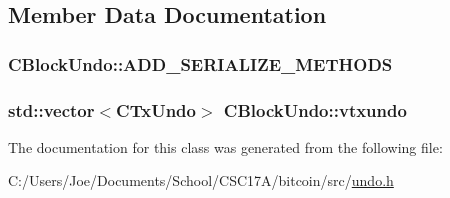 \subsection{Member Data Documentation}
\hypertarget{class_c_block_undo_a4fecc9723902f51e25b57e2e2d45334a}{}
\subsubsection[{A\+D\+D\+\_\+\+S\+E\+R\+I\+A\+L\+I\+Z\+E\+\_\+\+M\+E\+T\+H\+O\+D\+S}]{\setlength{\rightskip}{0pt plus 5cm}C\+Block\+Undo\+::\+A\+D\+D\+\_\+\+S\+E\+R\+I\+A\+L\+I\+Z\+E\+\_\+\+M\+E\+T\+H\+O\+D\+S}\label{class_c_block_undo_a4fecc9723902f51e25b57e2e2d45334a}
\hypertarget{class_c_block_undo_ad0baf7a4d3634b27b4affac2e7cf75c9}{}
\subsubsection[{vtxundo}]{\setlength{\rightskip}{0pt plus 5cm}std\+::vector$<${\bf C\+Tx\+Undo}$>$ C\+Block\+Undo\+::vtxundo}\label{class_c_block_undo_ad0baf7a4d3634b27b4affac2e7cf75c9}


The documentation for this class was generated from the following file\+:\begin{DoxyCompactItemize}
\item 
C\+:/\+Users/\+Joe/\+Documents/\+School/\+C\+S\+C17\+A/bitcoin/src/\hyperlink{undo_8h}{undo.\+h}\end{DoxyCompactItemize}
